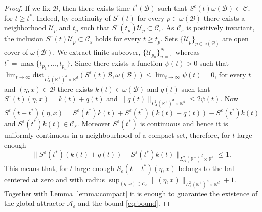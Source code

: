 \documentclass[11pt, leqno]{amsart}
\theoremstyle{definition}
\def\R{\mathbb{R}}
\begin{document}
\begin{proof}
If we fix $\mathcal{B}$, then there exists time $t^*(\mathcal{B})$ such that $S^\varepsilon(t)\omega(\mathcal{B})\subset \mathcal{C}_\varepsilon$ for $t\geq t^*$. Indeed, by continuity of $S^\varepsilon(t)$ for every $p\in \omega(\mathcal{B})$ there exists a neighborhood $\mathcal{U}_p$ and $t_p$ such that  $S^\varepsilon(t_p)\mathcal{U}_p \subset \mathcal{C}_{\varepsilon}$. As  $\mathcal{C}_{\varepsilon}$ is positively invariant, the inclusion $S^\varepsilon(t)\mathcal{U}_p \subset \mathcal{C}_{\varepsilon}$ holds for every $t\geq t_p$.
Sets $\{\mathcal{U}_p\}_{p\in \omega(\mathcal{B})}$ are open cover of  $\omega(\mathcal{B})$. We extract finite subcover,
	$\{\mathcal{U}_{p_n}\}_{n=1}^N$ whereas $t^* = \max\{t_{p_1},\ldots,t_{p_n}\}$. Since there exists a function $\psi(t) > 0$ such that
	$\lim_{t\to\infty}\textrm{dist}_{L^2_A(\R^+)^d\times \R^d}(S^\varepsilon(t)\mathcal{B},\omega(\mathcal{B})) \leq \lim_{t\to\infty}\psi(t) = 0$, for every $t$ and $(\eta,x)\in \mathcal{B}$ there exists $k(t) \in \omega(\mathcal{B})$ and $q(t)$ such that $S^\varepsilon(t)(\eta,x) = k(t) + q(t)$ and  $\|q(t)\|_{L^2_A(\R^+)^d\times \R^d} \leq 2\psi(t)$. Now
	$S^\varepsilon(t+t^*)(\eta,x) = S^\varepsilon(t^*)k(t) + S^\varepsilon(t^*)(k(t) + q(t))-S^\varepsilon(t^*)k(t)$ and  $S^\varepsilon(t^*)k(t) \in \mathcal{C}_\varepsilon$. Moreover $S^\varepsilon(t^*)$ is continuous and hence it is uniformly continuous in a neighbourhood of a compact set, therefore, for $t$ large enough
	$$
	\|S^\varepsilon(t^*)(k(t) + q(t))-S^\varepsilon(t^*)k(t)\|_{ L^2_A(\R^+)^d \times \R^d}\leq 1.
	$$
	This means that, for $t$ large enough
	$
	S_\varepsilon(t+t^*)(\eta,x)
	$ belongs to the ball centered at zero and with radius $\sup_{(\eta,x)\in \mathcal{C}_\varepsilon} \|(\eta,x)\|_{L^2_A(\R^+)^d\times \R^d} + 1$. Together with Lemma   \ref{lemma:compact} it is enough to guarantee the existence of the global attractor $\mathcal{A}_\varepsilon$ and the bound \eqref{eq:bound}.
\end{proof}
\end{document}
